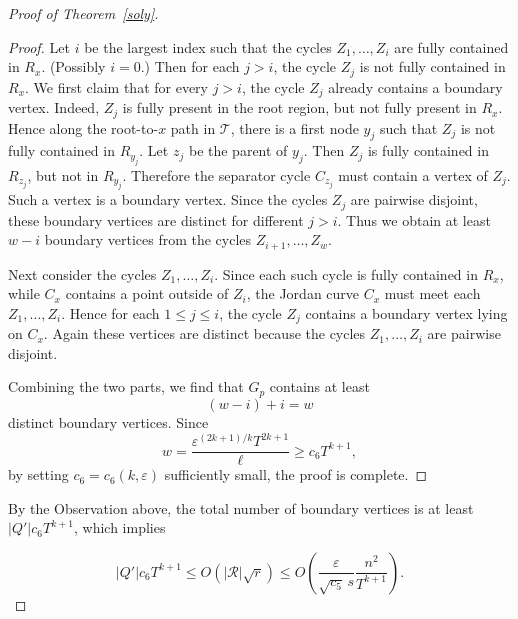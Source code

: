 \documentclass[10pt,a4paper]{amsart}
\begin{document}
\begin{proof}[Proof of Theorem~\ref{soly}]
\begin{proof}
Let \(i\) be the largest index such that the cycles \(Z_1,\dots,Z_i\) are fully contained in \(R_x\). (Possibly \(i=0\).) Then for each \(j>i\), the cycle \(Z_j\) is not fully contained in \(R_x\). We first claim that for every \(j>i\), the cycle \(Z_j\) already contains a boundary vertex. Indeed, \(Z_j\) is fully present in the root region, but not fully present in \(R_x\). Hence along the root-to-\(x\) path in \(\mathcal T\), there is a first node \(y_j\) such that \(Z_j\) is not fully contained in \(R_{y_j}\). Let \(z_j\) be the parent of \(y_j\). Then \(Z_j\) is fully contained in \(R_{z_j}\), but not in \(R_{y_j}\). Therefore the separator cycle \(C_{z_j}\) must contain a vertex of \(Z_j\). Such a vertex is a boundary vertex. Since the cycles \(Z_j\) are pairwise disjoint, these boundary vertices are distinct for different \(j>i\). Thus we obtain at least \(w-i\) boundary vertices from the cycles \(Z_{i+1},\dots,Z_w\).

Next consider the cycles \(Z_1,\dots,Z_i\). Since each such cycle is fully contained in \(R_x\), while \(C_x\) contains a point outside of $Z_i$, the Jordan curve \(C_x\) must meet each \(Z_1,\ldots, Z_i\). Hence for each \(1\le j\le i\), the cycle \(Z_j\) contains a boundary vertex lying on \(C_x\). Again these vertices are distinct because the cycles \(Z_1,\dots,Z_i\) are pairwise disjoint.

Combining the two parts, we find that \(G_p\) contains at least
\[
(w-i)+i=w
\]
distinct boundary vertices. Since
\[
w=\frac{\varepsilon^{(2k+1)/k}T^{2k+1}}{\ell}
\geq c_6 T^{k+1},
\]
by setting \(c_6=c_6(k,\varepsilon)\) sufficiently small, the proof is complete.
\end{proof}



























By the Observation above, the total number of boundary vertices is at least $|Q'|c_6T^{k + 1}$, which implies


$$|Q'|c_6T^{k + 1} \leq O( |\mathcal R|\sqrt{r}) \leq O\!\left(
\frac{\varepsilon}{\sqrt{c_5}\,s}
\frac{n^2}{T^{k+1}}
\right).
$$



\end{proof}
\end{document}
